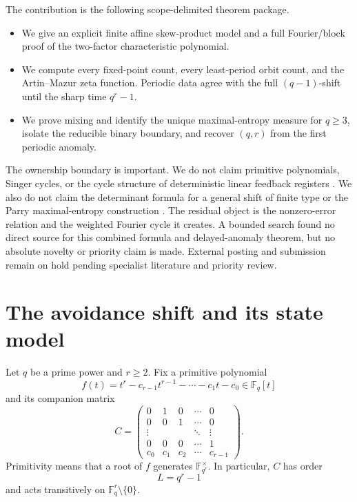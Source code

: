 \documentclass[11pt,a4paper]{amsart}
\theoremstyle{definition}
\theoremstyle{remark}
\newcommand{\F}{\mathbb F}
\begin{document}
The contribution is the following scope-delimited theorem package.
\begin{itemize}
 \item We give an explicit finite affine skew-product model and a full
 Fourier/block proof of the two-factor characteristic polynomial.
 \item We compute every fixed-point count, every least-period orbit count,
 and the Artin--Mazur zeta function.  Periodic data agree with the full
 $(q-1)$-shift until the sharp time $q^r-1$.
 \item We prove mixing and identify the unique maximal-entropy measure for
 $q\geq3$, isolate the reducible binary boundary, and recover $(q,r)$ from
 the first periodic anomaly.
\end{itemize}

The ownership boundary is important.  We do not claim primitive
polynomials, Singer cycles, or the cycle structure of deterministic linear
feedback registers \cite{GhorpadeHasanKumari2011,ChangEzermanLingWang2018}.
We also do not claim the determinant formula for a general shift of finite
type \cite{BowenLanford1970} or the Parry maximal-entropy construction
\cite{Parry1964}.  The residual object is the nonzero-error relation and the
weighted Fourier cycle it creates.  A bounded search found no direct source
for this combined formula and delayed-anomaly theorem, but no absolute
novelty or priority claim is made.  External posting and submission remain
on hold pending specialist literature and priority review.

\section{The avoidance shift and its state model}
\label{sec:model}

Let $q$ be a prime power and $r\geq2$.  Fix a primitive polynomial
\begin{equation}\label{eq:primitive-polynomial}
 f(t)=t^r-c_{r-1}t^{r-1}-\cdots-c_1t-c_0\in\F_q[t]
\end{equation}
and its companion matrix
\begin{equation}\label{eq:companion}
 C=
 \begin{pmatrix}
  0&1&0&\cdots&0\\
  0&0&1&\cdots&0\\
  \vdots&&&\ddots&\vdots\\
  0&0&0&\cdots&1\\
  c_0&c_1&c_2&\cdots&c_{r-1}
 \end{pmatrix}.
\end{equation}
Primitivity means that a root of $f$ generates $\F_{q^r}^{\times}$.  In
particular, $C$ has order
\[
 L=q^r-1
\]
and acts transitively on $\F_q^r\setminus\{0\}$.
\end{document}
